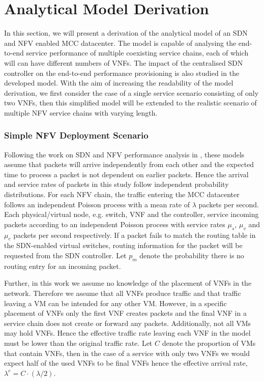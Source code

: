 
\section{Analytical Model Derivation}
\label{sec:analytical_model}

In this section, we will present a derivation of the analytical model of an SDN and NFV enabled MCC datacenter. The model is capable of analysing the end-to-end service performance of multiple coexisting service chains, each of which will can have different numbers of VNFs. The impact of the centralised SDN controller on the end-to-end performance provisioning is also studied in the developed model. With the aim of increasing the readability of the model derivation, we first consider the case of a single service scenario consisting of only two VNFs, then this simplified model will be extended to the realistic scenario of multiple NFV service chains with varying length.

\subsubsection{Simple NFV Deployment Scenario}
Following the work on SDN and NFV performance analysis in \cite{LongoDBS15, GebertZLST16, MiaoMWHZWL19}, these models assume that packets will arrive independently from each other and the expected time to process a packet is not dependent on earlier packets. Hence the arrival and service rates of packets in this study follow independent probability distributions. For each NFV chain, the traffic entering the MCC datacenter follows an independent Poisson process with a mean rate of $\lambda$ packets per second. Each physical/virtual node, e.g. switch, VNF and the controller, service incoming packets according to an independent Poisson process with service rates $\mu_{s}$, $\mu_{v}$ and $\mu_{c}$ packets per second respectively. If a packet fails to match the routing table in the SDN-enabled virtual switches, routing information for the packet will be requested from the SDN controller. Let $p_m$ denote the probability there is no routing entry for an incoming packet.

Further, in this work we assume no knowledge of the placement of VNFs in the network. Therefore we assume that all VNFs produce traffic and that traffic leaving a VM can be intended for any other VM. However, in a specific placement of VNFs only the first VNF creates packets and the final VNF in a service chain does not create or forward any packets. Additionally, not all VMs may hold VNFs. Hence the effective traffic rate leaving each VNF in the model must be lower than the original traffic rate. Let $C$ denote the proportion of VMs that contain VNFs, then in the case of a service with only two VNFs we would expect half of the used VNFs to be final VNFs hence the effective arrival rate, $\lambda^e = C \cdot (\lambda / 2)$.

